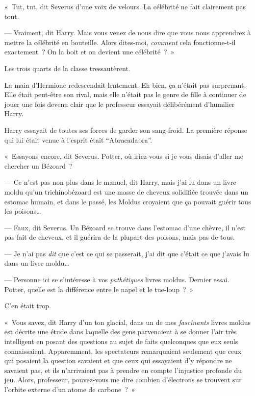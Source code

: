«~Tut, tut, dit Severus d'une voix de velours. La célébrité ne fait clairement pas tout.

--- Vraiment, dit Harry. Mais vous venez de nous dire que vous nous apprendrez à mettre la célébrité en bouteille. Alors dites-moi, \emph{comment} cela fonctionne-t-il exactement~? On la boit et on devient une célébrité~?~»

Les trois quarts de la classe tressautèrent.

La main d'Hermione redescendait lentement. Eh bien, ça n'était pas surprenant. Elle était peut-être son rival, mais elle n'était pas le genre de fille à continuer de jouer une fois devenu clair que le professeur essayait délibérément d'humilier Harry.

Harry essayait de toutes ses forces de garder son sang-froid. La première réponse qui lui était venue à l'esprit était “Abracadabra”.

«~Essayons encore, dit Severus. Potter, où iriez-vous si je vous disais d'aller me chercher un Bézoard~?

--- Ce n'est pas non plus dans le manuel, dit Harry, mais j'ai lu dans un livre moldu qu'un trichinobézoard est une masse de cheveux solidifiée trouvée dans un estomac humain, et dans le passé, les Moldus croyaient que ça pouvait guérir tous les poisons…

--- Faux, dit Severus. Un Bézoard se trouve dans l'estomac d'une chèvre, il n'est pas fait de cheveux, et il guérira de la plupart des poisons, mais pas de tous.

--- Je n'ai pas \emph{dit} que c'est ce qui se passerait, j'ai dit que c'était ce que j'avais lu dans un livre moldu…

--- Personne ici se s'intéresse à vos \emph{pathétiques} livres moldus. Dernier essai. Potter, quelle est la différence entre le napel et le tue-loup~?~»

C'en était trop.

«~Vous savez, dit Harry d'un ton glacial, dans un de mes \emph{fascinants} livres moldus est décrite une étude dans laquelle des gens parvenaient à se donner l'air très intelligent en posant des questions au sujet de faits quelconques que eux seuls connaissaient. Apparemment, les spectateurs remarquaient seulement que ceux qui posaient la question savaient et que ceux qui essayaient d'y répondre ne savaient pas, et ils n'arrivaient pas à prendre en compte l'injustice profonde du jeu. Alors, professeur, pouvez-vous me dire combien d'électrons se trouvent sur l'orbite externe d'un atome de carbone~?~»

